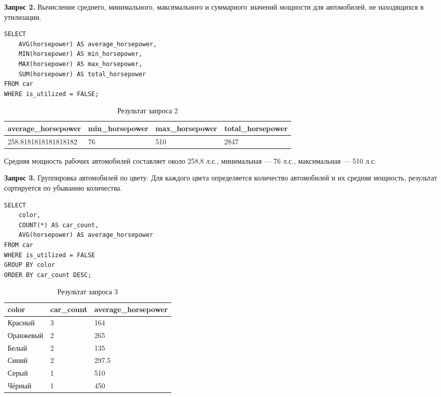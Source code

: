 \documentclass[oneside,a4paper,14pt]{extarticle}
\begin{document}
\textbf{Запрос 2.} Вычисление среднего, минимального, максимального и суммарного значений мощности для автомобилей, не находящихся в утилизации.

\begin{verbatim}
SELECT
    AVG(horsepower) AS average_horsepower,
    MIN(horsepower) AS min_horsepower,
    MAX(horsepower) AS max_horsepower,
    SUM(horsepower) AS total_horsepower
FROM car
WHERE is_utilized = FALSE;
\end{verbatim}

\begin{table}[H]
\centering
\footnotesize

\caption{Результат запроса 2}\label{tab:agg2}
\begin{tabular}{|l|l|l|l|}
\hline
\textbf{average\_\allowbreak horsepower} & \textbf{min\_\allowbreak horsepower} & \textbf{max\_\allowbreak horsepower} & \textbf{total\_\allowbreak horsepower} \\ \hline
258.8181818181818182 & 76 & 510 & 2847 \\ \hline
\end{tabular}
\end{table}

Средняя мощность рабочих автомобилей составляет около 258,8 л.с., минимальная --- 76 л.с., максимальная --- 510 л.с.


\textbf{Запрос 3.} Группировка автомобилей по цвету. Для каждого цвета определяется количество автомобилей и их средняя мощность, результат сортируется по убыванию количества.

\begin{verbatim}
SELECT
    color,
    COUNT(*) AS car_count,
    AVG(horsepower) AS average_horsepower
FROM car
WHERE is_utilized = FALSE
GROUP BY color
ORDER BY car_count DESC;
\end{verbatim}

\begin{table}[H]
\centering
\footnotesize

\caption{Результат запроса 3}\label{tab:agg3}
\begin{tabular}{|l|l|l|}
\hline
\textbf{color} & \textbf{car\_\allowbreak count} & \textbf{average\_\allowbreak horsepower} \\ \hline
Красный & 3 & 164 \\ \hline
Оранжевый & 2 & 265 \\ \hline
Белый & 2 & 135 \\ \hline
Синий & 2 & 297.5 \\ \hline
Серый & 1 & 510 \\ \hline
Чёрный & 1 & 450 \\ \hline
\end{tabular}
\end{table}
\end{document}
